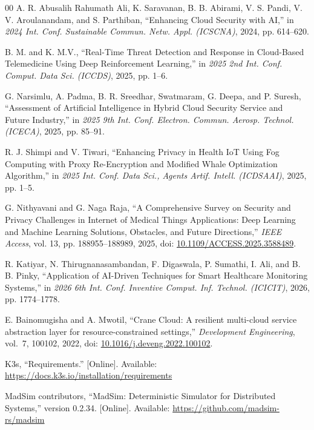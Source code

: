 \documentclass{ieeeaccess}
\begin{document}
\begin{thebibliography}{00}
 A. R. Abusalih Rahumath Ali, K. Saravanan, B. B. Abirami, V. S. Pandi, V. V. Aroulanandam, and S. Parthiban, ``Enhancing Cloud Security with AI,'' in \emph{2024 Int. Conf. Sustainable Commun. Netw. Appl. (ICSCNA)}, 2024, pp. 614--620.

 B. M. and K. M.V., ``Real-Time Threat Detection and Response in Cloud-Based Telemedicine Using Deep Reinforcement Learning,'' in \emph{2025 2nd Int. Conf. Comput. Data Sci. (ICCDS)}, 2025, pp. 1--6.

 G. Narsimlu, A. Padma, B. R. Sreedhar, Swatmaram, G. Deepa, and P. Suresh, ``Assessment of Artificial Intelligence in Hybrid Cloud Security Service and Future Industry,'' in \emph{2025 9th Int. Conf. Electron. Commun. Aerosp. Technol. (ICECA)}, 2025, pp. 85--91.

 R. J. Shimpi and V. Tiwari, ``Enhancing Privacy in Health IoT Using Fog Computing with Proxy Re-Encryption and Modified Whale Optimization Algorithm,'' in \emph{2025 Int. Conf. Data Sci., Agents Artif. Intell. (ICDSAAI)}, 2025, pp. 1--5.

 G. Nithyavani and G. Naga Raja, ``A Comprehensive Survey on Security and Privacy Challenges in Internet of Medical Things Applications: Deep Learning and Machine Learning Solutions, Obstacles, and Future Directions,'' \emph{IEEE Access}, vol. 13, pp. 188955--188989, 2025, doi: \href{https://doi.org/10.1109/ACCESS.2025.3588489}{10.1109/ACCESS.2025.3588489}.

 R. Katiyar, N. Thirugnanasambandan, F. Digaswala, P. Sumathi, I. Ali, and B. B. Pinky, ``Application of AI-Driven Techniques for Smart Healthcare Monitoring Systems,'' in \emph{2026 6th Int. Conf. Inventive Comput. Inf. Technol. (ICICIT)}, 2026, pp. 1774--1778.

 E. Bainomugisha and A. Mwotil, ``Crane Cloud: A resilient multi-cloud service abstraction layer for resource-constrained settings,'' \emph{Development Engineering}, vol.~7, 100102, 2022, doi: \href{https://doi.org/10.1016/j.deveng.2022.100102}{10.1016/j.deveng.2022.100102}.

 K3s, ``Requirements.'' [Online]. Available: \url{https://docs.k3s.io/installation/requirements}

 MadSim contributors, ``MadSim: Deterministic Simulator for Distributed Systems,'' version 0.2.34. [Online]. Available: \url{https://github.com/madsim-rs/madsim}


\end{thebibliography}
\end{document}
